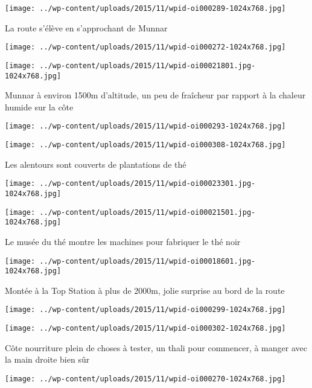  \newline
 \newline
\centerline{\texttt{[image: ../wp-content/uploads/2015/11/wpid-oi000289-1024x768.jpg]} } 
 \newline
 La route s'élève en s'approchant de Munnar \newline
 \newline
\centerline{\texttt{[image: ../wp-content/uploads/2015/11/wpid-oi000272-1024x768.jpg]} } 
 \newline
 \newline
\centerline{\texttt{[image: ../wp-content/uploads/2015/11/wpid-oi00021801.jpg-1024x768.jpg]} } 
 \newline
 Munnar à environ 1500m d'altitude, un peu de fraîcheur par rapport à la chaleur humide sur la côte \newline
 \newline
\centerline{\texttt{[image: ../wp-content/uploads/2015/11/wpid-oi000293-1024x768.jpg]} } 
 \newline
 \newline
\centerline{\texttt{[image: ../wp-content/uploads/2015/11/wpid-oi000308-1024x768.jpg]} } 
 \newline
 Les alentours sont couverts de plantations de thé \newline
 \newline
\centerline{\texttt{[image: ../wp-content/uploads/2015/11/wpid-oi00023301.jpg-1024x768.jpg]} } 
 \newline
 \newline
\centerline{\texttt{[image: ../wp-content/uploads/2015/11/wpid-oi00021501.jpg-1024x768.jpg]} } 
 \newline
 Le musée du thé montre les machines pour fabriquer le thé noir \newline
 \newline
\centerline{\texttt{[image: ../wp-content/uploads/2015/11/wpid-oi00018601.jpg-1024x768.jpg]} } 
 \newline
 Montée à la Top Station à plus de 2000m, jolie surprise au bord de la route \newline
 \newline
\centerline{\texttt{[image: ../wp-content/uploads/2015/11/wpid-oi000299-1024x768.jpg]} } 
 \newline
 \newline
\centerline{\texttt{[image: ../wp-content/uploads/2015/11/wpid-oi000302-1024x768.jpg]} } 
 \newline
 Côte nourriture plein de choses à tester, un thali pour commencer, à manger avec la main droite bien sûr \newline
 \newline
\centerline{\texttt{[image: ../wp-content/uploads/2015/11/wpid-oi000270-1024x768.jpg]} } 
 \newline

\newpage
 
